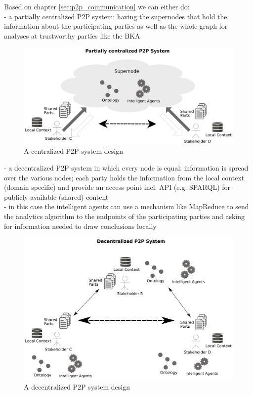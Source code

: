 \begin{appendices}
Based on chapter \ref{sec:p2p_communication} we can either do: \\
- a partially centralized P2P system: having the supernodes that hold the information about the participating parties as well as the
whole graph for analyses at trustworthy parties like the BKA \\

\begin{figure}[H]
	\centering
		\includegraphics[width=0.8\columnwidth]{images/system_P2P_centralized.pdf}
	\caption{A centralized P2P system design}
\label{fig:images_system_P2P_centralized}
\end{figure}

- a decentralized P2P system in which every node is equal: information is spread over the various nodes; each party holds the information
from the local context (domain specific) and provide an access point incl. API (e.g. SPARQL) for publicly available (shared) content \\
- in this case the intelligent agents can use a mechanism like MapReduce to send the analytics algorithm to the endpoints of the participating parties
and asking for information needed to draw conclusions locally \\

\begin{figure}[H]
	\centering
		\includegraphics[width=0.8\columnwidth]{images/system_P2P_decentralized.pdf}
	\caption{A decentralized P2P system design}
\label{fig:images_system_P2P_decentralized}
\end{figure}


\end{appendices}
